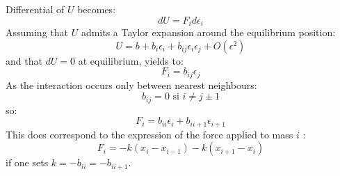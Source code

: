 \documentclass[12pt]{book}
\begin{document}
Differential of $U$ becomes:
\begin{equation}
dU=F_id\epsilon_i
\end{equation}
Assuming that $U$ admits a Taylor expansion around the equilibrium position:
\begin{equation}
U=b+b_i\epsilon_i+b_{ij}\epsilon_i\epsilon_j+O(\epsilon^2)
\end{equation}
and that $dU=0$ at equilibrium, yields to:
\begin{equation}
F_i=b_{ij}\epsilon_j
\end{equation}
As the interaction occurs only between nearest neighbours:
\begin{equation}
b_{ij}=0 \mbox{ si  } i\neq j\pm 1
\end{equation}
so:
\begin{equation}
F_i=b_{ii}\epsilon_i+b_{ii+1}\epsilon_{i+1}
\end{equation}
This does correspond to the expression of the force applied to mass $i$ :
\begin{equation}
F_i=-k(x_{i}-x_{i-1})-k(x_{i+1}-x_{i})
\end{equation}
if one sets $k=-b_{ii}=-b_{ii+1}$.
\end{document}
